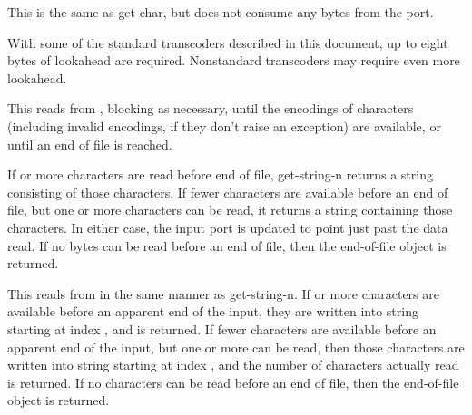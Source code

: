 \begin{entry}{%
}
   
This is the same as {\cf get-char}, but does not consume any bytes
from the port.

\begin{note}
  With some of the standard transcoders
  described in this document, up to eight bytes of lookahead are
  required. Nonstandard transcoders may require even more lookahead.
\end{note}
\end{entry}

\begin{entry}{%
}
   
This reads from , blocking as necessary, until the
encodings of  characters (including invalid encodings, if they
don't raise an exception) are available, or until an end of
file is reached.
   
If  or more characters are read before end of file, {\cf
  get-string-n} returns a string consisting of those 
characters. If fewer characters are available before an end of file,
but one or more characters can be read, it returns a string containing
those characters. In either case, the input port is updated to point
just past the data read. If no bytes can be read before an 
end of file, then the end-of-file object is returned.
\end{entry}

\begin{entry}{%
}


This reads from  in the same manner as {\cf
  get-string-n}.  If  or more characters are available
before an apparent end of the input, they are written into string
starting at index , and  is returned. If fewer
characters are available before an apparent end of the input, but one
or more can be read, then those characters are written into string
starting at index , and the number of characters actually read is
returned. If no characters can be read before an end of file,
then the end-of-file object is returned.
\end{entry}   

